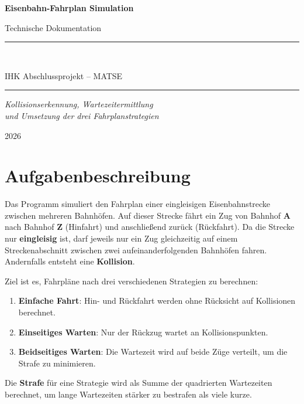 \documentclass[12pt,a4paper]{article}
\begin{document}
\begin{titlepage}
    \centering
    \vspace*{2cm}
    {\Huge\bfseries Eisenbahn-Fahrplan Simulation\par}
    \vspace{0.5cm}
    {\Large Technische Dokumentation\par}
    \vspace{2cm}
    \rule{\linewidth}{0.4pt}\\[0.5cm]
    {\large IHK Abschlussprojekt -- MATSE\par}
    \rule{\linewidth}{0.4pt}
    \vspace{2cm}
    {\large\itshape Kollisionserkennung, Wartezeitermittlung\\und Umsetzung der drei Fahrplanstrategien\par}
    \vfill
    {\large 2026\par}
\end{titlepage}

\tableofcontents
\newpage

\section{Aufgabenbeschreibung}

Das Programm simuliert den Fahrplan einer eingleisigen Eisenbahnstrecke zwischen mehreren Bahnhöfen. Auf dieser Strecke fährt ein Zug von Bahnhof \textbf{A} nach Bahnhof \textbf{Z} (Hinfahrt) und anschließend zurück (Rückfahrt). Da die Strecke nur \textbf{eingleisig} ist, darf jeweils nur ein Zug gleichzeitig auf einem Streckenabschnitt zwischen zwei aufeinanderfolgenden Bahnhöfen fahren. Andernfalls entsteht eine \textbf{Kollision}.

Ziel ist es, Fahrpläne nach drei verschiedenen Strategien zu berechnen:
\begin{enumerate}
    \item \textbf{Einfache Fahrt}: Hin- und Rückfahrt werden ohne Rücksicht auf Kollisionen berechnet.
    \item \textbf{Einseitiges Warten}: Nur der Rückzug wartet an Kollisionspunkten.
    \item \textbf{Beidseitiges Warten}: Die Wartezeit wird auf beide Züge verteilt, um die Strafe zu minimieren.
\end{enumerate}

Die \textbf{Strafe} für eine Strategie wird als Summe der quadrierten Wartezeiten berechnet, um lange Wartezeiten stärker zu bestrafen als viele kurze.
\end{document}
